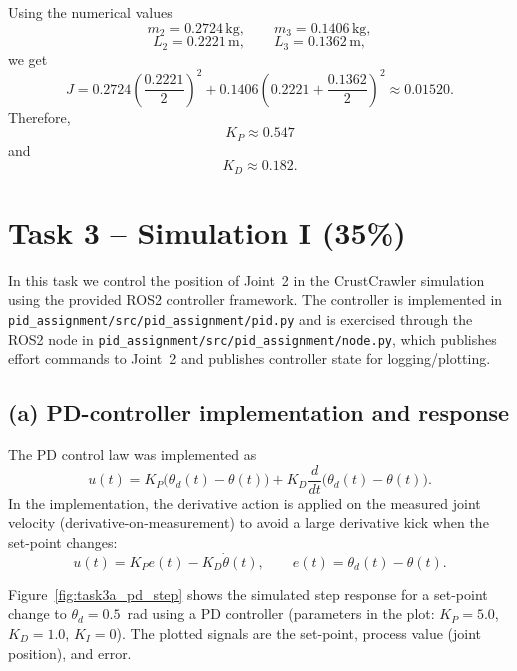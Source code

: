 \documentclass{article}
\begin{document}
Using the numerical values
\[
    m_2 = 0.2724\,\mathrm{kg},
    \qquad
    m_3 = 0.1406\,\mathrm{kg},
\]
\[
    L_2 = 0.2221\,\mathrm{m},
    \qquad
    L_3 = 0.1362\,\mathrm{m},
\]
we get
\begin{equation}
    J
    =
    0.2724\left(\frac{0.2221}{2}\right)^2
    +
    0.1406\left(0.2221+\frac{0.1362}{2}\right)^2
    \approx 0.01520.
\end{equation}
Therefore,
\begin{equation}
    \boxed{
    K_P \approx 0.547
    }
\end{equation}
and
\begin{equation}
    \boxed{
    K_D \approx 0.182
    }.
\end{equation}

\section{Task 3 -- Simulation I (35\%)}

In this task we control the position of Joint~2 in the CrustCrawler simulation using the provided ROS2 controller framework. The controller is implemented in \texttt{pid\_assignment/src/pid\_assignment/pid.py} and is exercised through the ROS2 node in \texttt{pid\_assignment/src/pid\_assignment/node.py}, which publishes effort commands to Joint~2 and publishes controller state for logging/plotting.

\subsection*{(a) PD-controller implementation and response}

The PD control law was implemented as
\begin{equation}
    u(t) = K_P\big(\theta_d(t)-\theta(t)\big) + K_D\frac{d}{dt}\big(\theta_d(t)-\theta(t)\big).
\end{equation}
In the implementation, the derivative action is applied on the measured joint velocity (derivative-on-measurement) to avoid a large derivative kick when the set-point changes:
\begin{equation}
    u(t) = K_P e(t) - K_D \dot{\theta}(t),
    \qquad
    e(t) = \theta_d(t)-\theta(t).
\end{equation}

Figure~\ref{fig:task3a_pd_step} shows the simulated step response for a set-point change to $\theta_d = 0.5$~rad using a PD controller (parameters in the plot: $K_P=5.0$, $K_D=1.0$, $K_I=0$). The plotted signals are the set-point, process value (joint position), and error.
\end{document}
